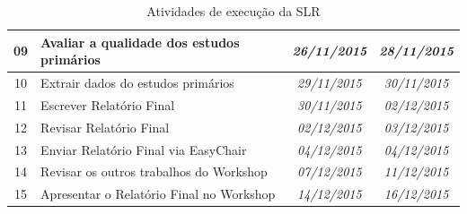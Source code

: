 \documentclass{article}
\begin{document}
\begin{table}[htb]
{\begin{tabular}{|c|l|c|c|}
09          & Avaliar a qualidade dos estudos primários                                                                                                 & \textit{26/11/2015}                              & \textit{28/11/2015}                               \\ \hline
10          & Extrair dados do estudos primários                                                                                                        & \textit{29/11/2015}                              & \textit{30/11/2015}                               \\ \hline
11          & Escrever Relatório Final                                                                                                                  & \textit{30/11/2015}                              & \textit{02/12/2015}                               \\ \hline
12          & Revisar Relatório Final                                                                                                                   & \textit{02/12/2015}                              & \textit{03/12/2015}                               \\ \hline
13          & Enviar Relatório Final via EasyChair                                                                                                      & \textit{04/12/2015}                              & \textit{04/12/2015}                               \\ \hline
14          & Revisar os outros trabalhos do Workshop                                                                                                   & \textit{07/12/2015}                              & \textit{11/12/2015}                               \\ \hline
15          & Apresentar o Relatório Final no Workshop                                                                                                  & \textit{14/12/2015}                              & \textit{16/12/2015}                               \\ \hline
\end{tabular}
}
\caption{Atividades de execução da SLR}
\label{tab:cronograma}
\end{table}

\medskip

\end{document}
